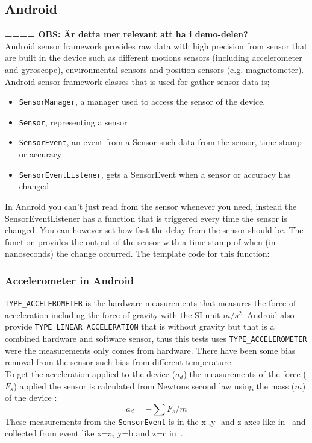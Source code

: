 \subsection{Android}\label{subsec:Android}
\textbf{==== OBS: Är detta mer relevant att ha i demo-delen?} \\
Android sensor framework provides raw data with high precision from sensor that are built in the device such as different motions sensors (including accelerometer and gyroscope), environmental sensors and position sensors (e.g. magnetometer). \cite[]{android:sensor}
Android sensor framework classes that is used for gather sensor data is; 
\begin{itemize}
	\item[] \texttt{SensorManager}, a manager used to access the sensor of the device. 
	\item[] \texttt{Sensor}, representing a sensor
	\item[] \texttt{SensorEvent}, an event from a Sensor such data from the sensor, time-stamp or accuracy
	\item[] \texttt{SensorEventListener}, gets a SensorEvent when a sensor or accuracy has changed 
\end{itemize}
In Android you can't just read from the sensor whenever you need, instead the SensorEventListener has a function that is triggered every time the sensor is changed. You can however set how fast the delay from the sensor should be. The function provides the output of the sensor with a time-stamp of when (in nanoseconds) the change occurred. The template code for this function:

\cite[]{android:sensorEvent} 




\subsubsection{Accelerometer in Android}\label{subsec:accAndroid}
\texttt{TYPE\_ACCELEROMETER} is the hardware measurements that measures the force of acceleration including the force of gravity with the SI unit $m/s^2$. Android also provide \texttt{TYPE\_LINEAR\_ACCELERATION} that is without gravity but that is a combined hardware and software sensor, thus this tests uses  \texttt{TYPE\_ACCELEROMETER} were the measurements only comes from hardware. There have been some bias removal from the sensor such bias from different temperature. \\
To get the acceleration applied to the device ($a_d$) the measurements of the force ($F_s$) applied the sensor is calculated from Newtons second law using the mass ($m$) of the device :
$$a_d=-\sum F_s / m $$ 
These measurements from the \texttt{SensorEvent} is in the x-,y- and z-axes like in~ and collected from event like x=a, y=b and z=c in~. \cite[]{android:sensorEvent}


